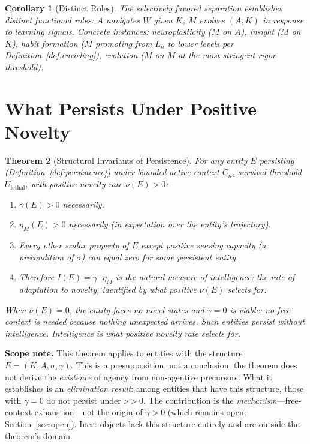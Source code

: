 \documentclass[11pt]{article}
\newtheorem{theorem}{Theorem}
\newtheorem{corollary}[theorem]{Corollary}
\theoremstyle{definition}
\theoremstyle{remark}
\begin{document}
\begin{corollary}[Distinct Roles]
\label{cor:roles}
The selectively favored separation establishes distinct functional roles:
$A$ navigates $W$ given $K$; $M$ evolves $(A, K)$ in response to
learning signals. Concrete instances: neuroplasticity ($M$ on $A$),
insight ($M$ on $K$), habit formation ($M$ promoting from $L_n$ to
lower levels per Definition~\ref{def:encoding}), evolution ($M$ on $M$
at the most stringent rigor threshold).
\end{corollary}

\section{What Persists Under Positive Novelty}
\label{sec:necessity}

\begin{theorem}[Structural Invariants of Persistence]
\label{thm:invariants}
For any entity $E$ persisting (Definition~\ref{def:persistence}) under
bounded active context $C_n$, survival threshold
$U_{\mathrm{lethal}}$, with positive novelty rate $\nu(E) > 0$:
\begin{enumerate}
\item[(i)] $\gamma(E) > 0$ necessarily.
\item[(ii)] $\eta_M(E) > 0$ necessarily (in expectation over the
      entity's trajectory).
\item[(iii)] Every other scalar property of $E$ except positive
      sensing capacity (a precondition of $\sigma$) can equal zero
      for some persistent entity.
\item[(iv)] Therefore $I(E) = \gamma \cdot \eta_M$ is the natural measure
      of intelligence: the rate of adaptation to novelty, identified
      by what positive $\nu(E)$ selects for.
\end{enumerate}

When $\nu(E) = 0$, the entity faces no novel states and $\gamma = 0$ is
viable: no free context is needed because nothing unexpected arrives.
Such entities persist without intelligence. Intelligence is what positive
novelty rate selects for.
\end{theorem}

\textbf{Scope note.} This theorem applies to entities with the
structure $E = (K, A, \sigma, \gamma)$. This is a presupposition, not a
conclusion: the theorem does not derive the \emph{existence} of agency
from non-agentive precursors. What it establishes is an
\emph{elimination result}: among entities that have this structure,
those with $\gamma = 0$ do not persist under $\nu > 0$. The
contribution is the \emph{mechanism}---free-context exhaustion---not
the origin of $\gamma > 0$ (which remains open;
Section~\ref{sec:open}). Inert objects lack this structure entirely
and are outside the theorem's domain.
\end{document}
